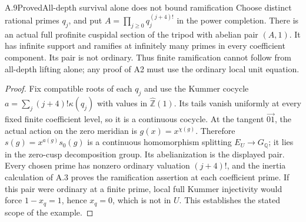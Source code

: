 \begin{result}{A.9}{Proved}{All-depth survival alone does not bound ramification}
Choose distinct rational primes \(q_j\), and put
\(A=\prod_{j\ge0}q_j^{(j+4)!}\) in the power completion.
There is an actual full profinite cuspidal section of the tripod with
abelian pair \((A,1)\). It has infinite support and ramifies at infinitely
many primes in every coefficient component. Its pair is not ordinary.
Thus finite ramification cannot follow from all-depth lifting alone;
any proof of A2 must use the ordinary local unit equation.
\end{result}
\begin{proof}
Fix compatible roots of each \(q_j\) and use the Kummer cocycle
\(a=\sum_j(j+4)!\kappa(q_j)\) with values in
\(\widehat{\mathbb Z}(1)\). Its tails vanish uniformly at every fixed
finite coefficient level, so it is a continuous cocycle. At the tangent
\(\overrightarrow{01}\), the actual action on the zero meridian is
\(g(x)=x^{\chi(g)}\). Therefore
\(s(g)=x^{a(g)}s_0(g)\) is a continuous homomorphism splitting
\(E_U\to G_{\mathbb Q}\); it lies in the zero-cusp decomposition
group. Its abelianization is the displayed pair. Every chosen prime has
nonzero ordinary valuation \((j+4)!\), and the inertia calculation of
A.3 proves the ramification assertion at each coefficient prime.
If this pair were ordinary at a finite prime, local full Kummer
injectivity would force \(1-x_q=1\), hence \(x_q=0\), which is not
in \(U\). This establishes the stated scope of the example.
\end{proof}
